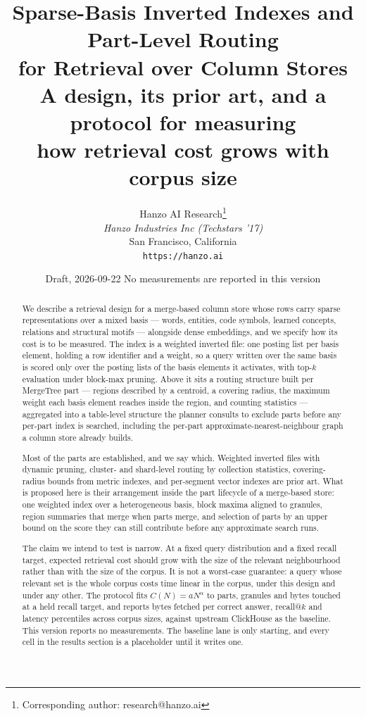 \documentclass[11pt]{article}
\title{Sparse-Basis Inverted Indexes and Part-Level Routing\\
for Retrieval over Column Stores\\[0.35em]
{\large A design, its prior art, and a protocol for measuring\\
how retrieval cost grows with corpus size}}
\author{
    Hanzo AI Research\thanks{Corresponding author: research@hanzo.ai} \\
    \textit{Hanzo Industries Inc (Techstars '17)} \\
    San Francisco, California \\
    \texttt{https://hanzo.ai}
}
\date{Draft, 2026-09-22 \quad No measurements are reported in this version}
\theoremstyle{definition}
\theoremstyle{plain}
\theoremstyle{remark}
\begin{document}
\hanzocoverpage
\maketitle

\begin{abstract}
\noindent
We describe a retrieval design for a merge-based column store whose rows carry
sparse representations over a mixed basis --- words, entities, code symbols,
learned concepts, relations and structural motifs --- alongside dense
embeddings, and we specify how its cost is to be measured. The index is a
weighted inverted file: one posting list per basis element, holding a row
identifier and a weight, so a query written over the same basis is scored only
over the posting lists of the basis elements it activates, with top-$k$
evaluation under block-max pruning. Above it sits a routing structure built per
MergeTree part --- regions described by a centroid, a covering radius, the
maximum weight each basis element reaches inside the region, and counting
statistics --- aggregated into a table-level structure the planner consults to
exclude parts before any per-part index is searched, including the per-part
approximate-nearest-neighbour graph a column store already builds.

Most of the parts are established, and we say which. Weighted inverted files
with dynamic pruning, cluster- and shard-level routing by collection
statistics, covering-radius bounds from metric indexes, and per-segment vector
indexes are prior art. What is proposed here is their arrangement inside the
part lifecycle of a merge-based store: one weighted index over a heterogeneous
basis, block maxima aligned to granules, region summaries that merge when parts
merge, and selection of parts by an upper bound on the score they can still
contribute before any approximate search runs.

The claim we intend to test is narrow. At a fixed query distribution and a
fixed recall target, expected retrieval cost should grow with the size of the
relevant neighbourhood rather than with the size of the corpus. It is not a
worst-case guarantee: a query whose relevant set is the whole corpus costs time
linear in the corpus, under this design and under any other. The protocol fits
$C(N) = aN^{\alpha}$ to parts, granules and bytes touched at a held recall
target, and reports bytes fetched per correct answer, recall@$k$ and latency
percentiles across corpus sizes, against upstream ClickHouse as the baseline.
This version reports no measurements. The baseline lane is only starting, and
every cell in the results section is a placeholder until it writes one.
\end{abstract}











{\small


}
\end{document}
